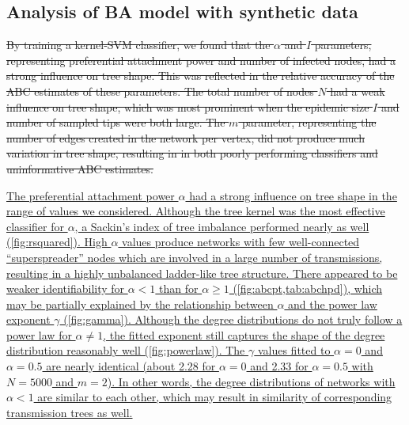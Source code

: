 \documentclass[12pt]{article}\usepackage[]{graphicx}\usepackage[]{color}
\let\mref\cref
\renewcommand{\cref}[1]{\mbox{\mref{#1}}}
\newcommand{\add}[1]{\color{blue} \uline{#1} \color{black}}
\newcommand{\del}[1]{\color{red} \sout{#1} \color{black}}
\begin{document}
\subsection*{Analysis of BA model with synthetic data}

\del{By training a kernel-SVM classifier, we found that the $\alpha$ and $I$
parameters, representing preferential attachment power and number of infected
nodes, had a strong influence on tree shape. This was reflected in the relative
accuracy of the ABC estimates of these parameters. The total number of
nodes $N$ had a weak influence on tree shape, which was most prominent when the
epidemic size $I$ and number of sampled tips were both large. The $m$
parameter, representing the number of edges created in the network per vertex,
did not produce much variation in tree shape, resulting in in both poorly
performing classifiers and uninformative ABC estimates.}

\add{The preferential attachment power $\alpha$ had a strong influence on tree
shape in the range of values we considered. Although the tree kernel was the
most effective classifier for $\alpha$, a Sackin's index of tree imbalance
performed nearly as well (\cref{fig:rsquared}). High $\alpha$ values produce
networks with few well-connected ``superspreader'' nodes which are involved in
a large number of transmissions, resulting in a highly unbalanced ladder-like
tree structure. There appeared to be weaker identifiability for $\alpha < 1$
than for $\alpha \geq 1$ (\cref{fig:abcpt,tab:abchpd}), which may be partially
explained by the relationship between $\alpha$ and the power law exponent
$\gamma$ (\cref{fig:gamma}). Although the degree distributions do not truly
follow a power law for $\alpha \neq 1$, the fitted exponent still captures the
shape of the degree distribution reasonably well (\cref{fig:powerlaw}). The
$\gamma$ values fitted to $\alpha = 0$ and $\alpha = 0.5$ are nearly identical
(about 2.28 for $\alpha = 0$ and 2.33 for $\alpha = 0.5$ with $N = 5000$ and $m
= 2$). In other words, the degree distributions of networks with $\alpha < 1$
are similar to each other, which may result in similarity of corresponding
transmission trees as well.}
\end{document}
